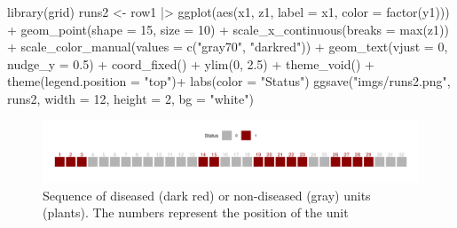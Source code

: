\documentclass[
  letterpaper,
]{book}
\newenvironment{Shaded}{\begin{snugshade}}{\end{snugshade}}
\newcommand{\AttributeTok}[1]{\textcolor[rgb]{0.40,0.45,0.13}{#1}}
\newcommand{\DecValTok}[1]{\textcolor[rgb]{0.68,0.00,0.00}{#1}}
\newcommand{\FloatTok}[1]{\textcolor[rgb]{0.68,0.00,0.00}{#1}}
\newcommand{\FunctionTok}[1]{\textcolor[rgb]{0.28,0.35,0.67}{#1}}
\newcommand{\NormalTok}[1]{\textcolor[rgb]{0.00,0.23,0.31}{#1}}
\newcommand{\OtherTok}[1]{\textcolor[rgb]{0.00,0.23,0.31}{#1}}
\newcommand{\SpecialCharTok}[1]{\textcolor[rgb]{0.37,0.37,0.37}{#1}}
\newcommand{\StringTok}[1]{\textcolor[rgb]{0.13,0.47,0.30}{#1}}
\begin{document}
\begin{Shaded}
\begin{Highlighting}[]
\FunctionTok{library}\NormalTok{(grid)}
\NormalTok{runs2 }\OtherTok{\textless{}{-}}\NormalTok{ row1 }\SpecialCharTok{|\textgreater{}}
  \FunctionTok{ggplot}\NormalTok{(}\FunctionTok{aes}\NormalTok{(x1, z1, }\AttributeTok{label =}\NormalTok{ x1, }\AttributeTok{color =} \FunctionTok{factor}\NormalTok{(y1))) }\SpecialCharTok{+}
  \FunctionTok{geom\_point}\NormalTok{(}\AttributeTok{shape =} \DecValTok{15}\NormalTok{, }\AttributeTok{size =} \DecValTok{10}\NormalTok{) }\SpecialCharTok{+}
  \FunctionTok{scale\_x\_continuous}\NormalTok{(}\AttributeTok{breaks =} \FunctionTok{max}\NormalTok{(z1)) }\SpecialCharTok{+}
  \FunctionTok{scale\_color\_manual}\NormalTok{(}\AttributeTok{values =} \FunctionTok{c}\NormalTok{(}\StringTok{"gray70"}\NormalTok{, }\StringTok{"darkred"}\NormalTok{)) }\SpecialCharTok{+}
  \FunctionTok{geom\_text}\NormalTok{(}\AttributeTok{vjust =} \DecValTok{0}\NormalTok{, }\AttributeTok{nudge\_y =} \FloatTok{0.5}\NormalTok{) }\SpecialCharTok{+}
  \FunctionTok{coord\_fixed}\NormalTok{() }\SpecialCharTok{+}
  \FunctionTok{ylim}\NormalTok{(}\DecValTok{0}\NormalTok{, }\FloatTok{2.5}\NormalTok{) }\SpecialCharTok{+}
  \FunctionTok{theme\_void}\NormalTok{() }\SpecialCharTok{+}
   \FunctionTok{theme}\NormalTok{(}\AttributeTok{legend.position =} \StringTok{"top"}\NormalTok{)}\SpecialCharTok{+}
  \FunctionTok{labs}\NormalTok{(}\AttributeTok{color =} \StringTok{"Status"}\NormalTok{)}
\FunctionTok{ggsave}\NormalTok{(}\StringTok{"imgs/runs2.png"}\NormalTok{, runs2, }\AttributeTok{width =} \DecValTok{12}\NormalTok{, }\AttributeTok{height =} \DecValTok{2}\NormalTok{, }\AttributeTok{bg =} \StringTok{"white"}\NormalTok{)}
\end{Highlighting}
\end{Shaded}

\begin{figure}

{\centering \includegraphics{imgs/runs2.png}

}

\caption{\label{fig-runs2}Sequence of diseased (dark red) or
non-diseased (gray) units (plants). The numbers represent the position
of the unit}

\end{figure}
\end{document}
